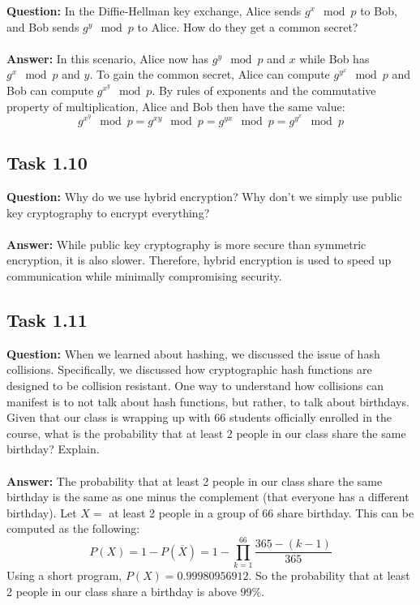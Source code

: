 \documentclass[11pt]{article}
\begin{document}
\textbf{Question: } 
In the Diffie-Hellman key exchange, Alice sends $g^x \mod p$ to Bob, and Bob sends $g^y \mod p$ to Alice. How do they get a common secret? \\\\
\textbf{Answer: } In this scenario, Alice now has $g^y \mod p$ and $x$ while Bob has $g^x \mod p$ and $y$. To gain the common secret, Alice can compute $g^{y^x} \mod p$ and Bob can compute $g^{x^y} \mod p$. By rules of exponents and the commutative property of multiplication, Alice and Bob then have the same value:
$$ g^{x^y} \mod p = g^{xy} \mod p = g^{yx} \mod p = g^{y^x} \mod p $$

\subsection*{Task 1.10}

\textbf{Question: } Why do we use hybrid encryption? Why don’t we simply use public key cryptography to encrypt everything? \\\\
\textbf{Answer: } While public key cryptography is more secure than symmetric encryption, it is also slower. Therefore, hybrid encryption is used to speed up communication while minimally compromising security.

\subsection*{Task 1.11}

\textbf{Question: } When we learned about hashing, we discussed the issue of hash collisions. Specifically, we discussed how cryptographic hash functions are designed to be collision resistant. One way to understand how collisions can manifest is to not talk about hash functions, but rather, to talk about birthdays. Given that our class is wrapping up with 66 students officially enrolled in the course, what is the probability that at least 2 people in our class share the same birthday? Explain. \\\\
\textbf{Answer: } The probability that at least 2 people in our class share the same birthday is the same as one minus the complement (that everyone has a different birthday). Let $X = $ at least 2 people in a group of 66 share birthday. This can be computed as the following:
$$ P(X) = 1 - P(\overline{X}) = 1 - \prod_{k=1}^{66} \dfrac{365 - (k-1)}{365} $$
Using a short program, $P(X) = 0.99980956912$. So the probability that at least 2 people in our class share a birthday is above $99\%$.
\end{document}
